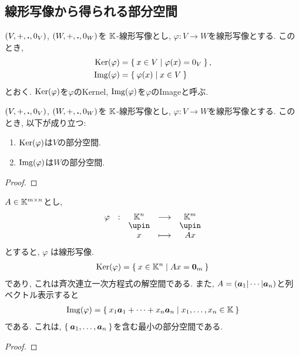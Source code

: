 \subsection{線形写像から得られる部分空間}

\begin{definition}
  $(V,+,\mathbin{\boldsymbol{.}},0_V)$,
  $(W,+,\mathbin{\boldsymbol{.}},0_W)$を
  $\mathbb{K}$-線形写像とし,
  $\varphi\colon V\to W$を線形写像とする.
  このとき,
  \begin{align*}
    \operatorname{Ker}(\varphi)&=\Set{x\in V|\varphi(x)=0_V  },\\
    \operatorname{Img}(\varphi)&=\Set{\varphi(x)|x\in V}\\
  \end{align*}
  とおく. $\operatorname{Ker}(\varphi)$を$\varphi$のKernel,
  $\operatorname{Img}(\varphi)$を$\varphi$のImageと呼ぶ.
\end{definition}
\begin{prop}
  $(V,+,\mathbin{\boldsymbol{.}},0_V)$,
  $(W,+,\mathbin{\boldsymbol{.}},0_W)$を
  $\mathbb{K}$-線形写像とし,
  $\varphi\colon V\to W$を線形写像とする.
このとき, 以下が成り立つ:
\begin{enumerate}
  \item $\operatorname{Ker}(\varphi)$は$V$の部分空間.
  \item $\operatorname{Img}(\varphi)$は$W$の部分空間.
\end{enumerate}
\end{prop}
\begin{proof}\end{proof}

\begin{example}
  $A\in \mathbb{K}^{m\times n}$とし,
  \begin{align*}
    \shazo{\varphi}{\KK^{n}}{\KK^{m}}
    {x}{Ax}
  \end{align*}
  とすると, $\varphi$
  は線形写像.
  \begin{align*}
    \operatorname{Ker}(\varphi)=\Set{x\in\mathbb{K}^n|Ax=\boldsymbol{0}_m}
  \end{align*}
  であり, これは斉次連立一次方程式の解空間である.
  また, $A=(\boldsymbol{a}_1|\cdots|\boldsymbol{a}_n)$と列ベクトル表示すると
  \begin{align*}
    \operatorname{Img}(\varphi)=\Set{x_1\boldsymbol{a}_1+\cdots+x_n\boldsymbol{a}_n|x_1,\ldots,x_n\in \mathbb{K}}
  \end{align*}
  である. これは, $\Set{\boldsymbol{a}_1,\ldots,\boldsymbol{a}_n}$を含む最小の部分空間である.
\end{example}
\begin{proof}\end{proof}


